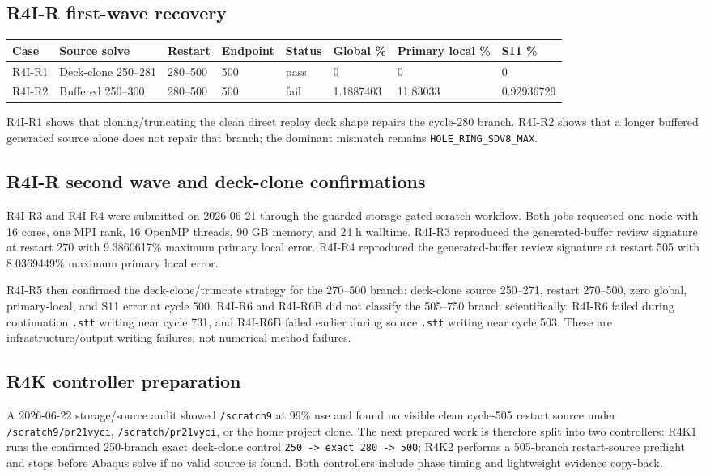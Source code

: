 \documentclass{article}
\begin{document}
\subsection*{R4I-R first-wave recovery}
\small
\setlength{\tabcolsep}{2pt}
\begin{longtable}{p{}p{}p{}p{}p{}p{}p{}p{}}
\toprule
Case & Source solve & Restart & Endpoint & Status & Global \% & Primary local \% & S11 \% \\
\midrule
R4I-R1 & Deck-clone 250--281 & 280--500 & 500 & pass & 0 & 0 & 0 \\
R4I-R2 & Buffered 250--300 & 280--500 & 500 & fail & 1.1887403 & 11.83033 & 0.92936729 \\
\bottomrule
\end{longtable}
\setlength{\tabcolsep}{6pt}
\normalsize

R4I-R1 shows that cloning/truncating the clean direct replay deck shape repairs the cycle-280 branch. R4I-R2 shows that a longer buffered generated source alone does not repair that branch; the dominant mismatch remains \texttt{HOLE\_RING\_SDV8\_MAX}.

\subsection*{R4I-R second wave and deck-clone confirmations}
R4I-R3 and R4I-R4 were submitted on 2026-06-21 through the guarded storage-gated scratch workflow. Both jobs requested one node with 16 cores, one MPI rank, 16 OpenMP threads, 90 GB memory, and 24 h walltime. R4I-R3 reproduced the generated-buffer review signature at restart 270 with 9.3860617\% maximum primary local error. R4I-R4 reproduced the generated-buffer review signature at restart 505 with 8.0369449\% maximum primary local error.

R4I-R5 then confirmed the deck-clone/truncate strategy for the 270--500 branch: deck-clone source 250--271, restart 270--500, zero global, primary-local, and S11 error at cycle 500. R4I-R6 and R4I-R6B did not classify the 505--750 branch scientifically. R4I-R6 failed during continuation \texttt{.stt} writing near cycle 731, and R4I-R6B failed earlier during source \texttt{.stt} writing near cycle 503. These are infrastructure/output-writing failures, not numerical method failures.

\subsection*{R4K controller preparation}
A 2026-06-22 storage/source audit showed \texttt{/scratch9} at 99\% use and found no visible clean cycle-505 restart source under \texttt{/scratch9/pr21vyci}, \texttt{/scratch/pr21vyci}, or the home project clone. The next prepared work is therefore split into two controllers: R4K1 runs the confirmed 250-branch exact deck-clone control \texttt{250 -> exact 280 -> 500}; R4K2 performs a 505-branch restart-source preflight and stops before Abaqus solve if no valid source is found. Both controllers include phase timing and lightweight evidence copy-back.
\end{document}
